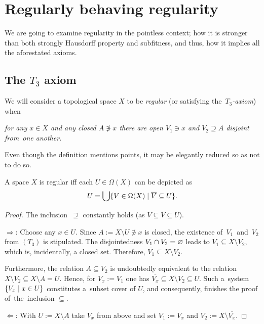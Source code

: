 \chapter{Regularly behaving regularity}

We are going to examine regularity in the pointless context;
how it is stronger than both strongly Hausdorff property and subfitness, and
thus, how it implies all the aforestated axioms.

\section{The $T_3$ axiom}

\begin{framed}
  \begin{df}[$T_3$]
    We will consider a topological space $X$ to be \emph{regular\/} (or
    satisfying the~\emph{$T_3$-axiom\/}) when
    \begin{center} \it
      for any $x\in X$ and any closed $A \not\owns x$ there are open $V_1\owns
      x$ and $V_2\supseteq A$ disjoint from~one another.
    \end{center}
  \end{df}
\end{framed}

Even though the definition mentions points, it may be elegantly reduced so as
not to do so.

\begin{prop} \label{reg-char}
  A space $X$ is regular iff each $U\in \Omega(X)$ can be depicted as
  \[
    U = \bigcup \{V\in \Omega(X) \mid \overline{V} \subseteq U\}.
  \]
\end{prop}
\begin{proof}
  The inclusion~$\supseteq$ constantly holds (as $V\subseteq
  \overline{V}\subseteq U$).

  $\Rightarrow$:
  Choose any $x\in U$.
  Since $A := X\setminus U \not\owns x$ is closed, the existence
  of~$V_1$~and~$V_2$ from $(T_3)$ is stipulated.
  The disjointedness $V_1 \cap V_2 = \varnothing$ leads to $V_1\subseteq X\setminus
  V_2$, which is, incidentally, a closed set.
  Therefore, $\overline{V_1}\subseteq X\setminus V_2$.

  Furthermore, the relation $A\subseteq V_2$ is undoubtedly equivalent to the
  relation $X\setminus V_2\subseteq X \setminus A = U$.
  Hence, for $V_x := V_1$ one has $\overline{V_x}\subseteq X\setminus V_2\subseteq
  U$.
  Such a~system $\{V_x \mid x\in U\}$ constitutes a~subset cover of $U$, and
  consequently, finishes the proof of~the~inclusion $\subseteq$.

  $\Leftarrow$:
  With $U := X\setminus A$ take $V_x$ from above and set $V_1 := V_x$ and $V_2
  := X\setminus \overline{V_x}$.
\end{proof}

